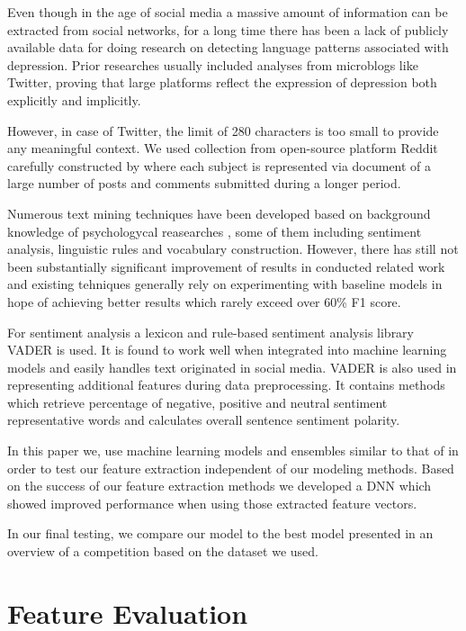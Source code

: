 \documentclass[10pt, a4paper]{article}
\begin{document}
Even though in the age of social media a massive amount of information can be extracted from
 social networks, for a long time there has been a lack of publicly available data for doing
 research on detecting language patterns associated with depression. Prior researches
 usually included analyses from microblogs like Twitter, proving that large platforms reflect the
 expression of depression both explicitly and implicitly.

 However, in case of Twitter, the limit of 280 characters is too small to provide any meaningful context.
 We used collection from open-source platform Reddit carefully constructed by \cite{losada2016test}
 where each subject is represented via document of a large number of posts and comments submitted
 during a longer period.

 Numerous text mining techniques have been developed based on background knowledge of
 psychologycal reasearches \cite{wang2013depression}, some of them including sentiment analysis, linguistic rules and
 vocabulary construction. However, there has still not been substantially significant improvement
 of results in conducted related work and existing tehniques generally rely on experimenting with
 baseline models in hope of achieving better results which rarely exceed over 60\% F1 score.

 For sentiment analysis a lexicon and rule-based sentiment analysis library VADER \cite{gilbert2014vader} is used.
 It is found to work well when integrated into machine learning models and easily handles text originated in social
 media. VADER is also used in \cite{leiva2017towards} representing additional features during data preprocessing.
 It contains methods which retrieve percentage of negative, positive and neutral sentiment
 representative words and calculates overall sentence sentiment polarity.

 In this paper we, use machine learning models and ensembles similar to that of \cite{polikar2006ensemble} in order
 to test our feature extraction independent of our modeling methods. Based on the success of our feature extraction
 methods we developed a DNN which showed improved performance when using those extracted feature vectors.

 In our final testing, we compare our model to the best model presented in an overview of a competition \cite{losadaclef}
 based on the dataset we used. 

\section{Feature Evaluation}
\end{document}
